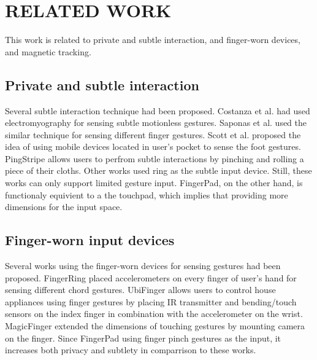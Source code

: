 \section{RELATED WORK}
This work is related to private and subtle interaction, and finger-worn devices, and magnetic tracking.

\subsection{Private and subtle interaction}
Several subtle interaction technique had been proposed. 
Costanza et al.  \cite{Costanza:2007} had used electromyography for sensing subtle motionless gestures. 
Saponas et al. \cite{Saponas:2009} used the similar technique for sensing different finger gestures.  
Scott et al. \cite{Scott:2010} proposed the idea of using mobile devices located in user's pocket to sense the foot gestures.
PingStripe \cite{Karrer:2010} allows users to perfrom subtle interactions by pinching and rolling a piece of their cloths.
Other works \cite{Ashbrook:2011, Ogata:2012} used ring as the subtle input device.
Still, these works can only support limited gesture input. 
FingerPad, on the other hand,  is functionaly equivient to a the touchpad, which implies that providing more dimensions for the input space.

\subsection{Finger-worn input devices}
Several works using the finger-worn devices for sensing gestures had been proposed. 
FingerRing \cite{Fukumoto:1994} placed accelerometers on every finger of user's hand for sensing different chord gestures.     
UbiFinger \cite{4030901} allows users to control house appliances using finger gestures by placing IR transmitter and bending/touch sensors on the index finger in combination with the accelerometer on the wrist.
MagicFinger \cite{Yang:2012} extended the dimensions of touching gestures by mounting camera on the finger.
Since FingerPad using finger pinch gestures as the input, it increases both privacy and subtlety in comparrison to these works. 

